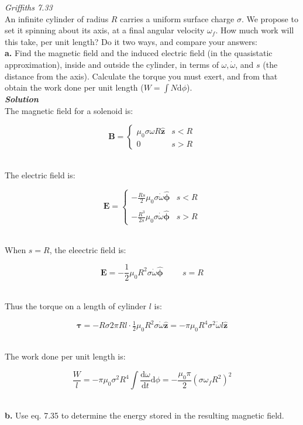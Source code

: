 \documentclass[14pt]{extarticle}
\renewcommand{\v}[1]{{\bm #1}}
\newcommand{\hv}[1]{\hat{\bm{#1}}}
\newcommand{\bfit}[1]{\textbf{\textit{#1}}}
\renewcommand{\d}{\text{d}}
\newcommand{\ddt}[1]{\frac{\d #1}{\d t}}
\newcommand{\muo}{\mu_0}
\begin{document}
{\it Griffiths 7.33} \\ 

An infinite cylinder of radius $R$ carries a uniform surface charge $\sigma$. We propose to set it spinning about its axis, at a final angular velocity $\omega_f$. How much work will this take, per unit length? Do it two ways, and compare your answers: \\ 

{\Large \bf a.} Find the magnetic field and the induced electric field (in the quasistatic  approximation), inside and outside the cylinder, in terms of $\omega,  \dot\omega$, and $s$ (the distance from the axis). Calculate the torque you must exert, and from that obtain the work  done per unit length ($W = \int N\d\phi$). \\ 

{\bfit{Solution}} \\ 

The magnetic field for a solenoid is:

$$
\v B = 
\begin{cases}
	\muo \sigma\omega R \hv z & s < R \\ 
	0 & s > R
\end{cases}
$$ \ 

The electric field is:

$$
\v E = 
\begin{cases}
	 -\frac{Rs}{2} \muo \sigma \dot\omega \hv \phi & s < R \\
	 \\ 
	 -\frac{R^3}{2s} \muo \sigma \dot\omega \hv \phi & s > R
\end{cases}
$$ \ 

When $s=R$, the eleectric field is:

$$\v E = -\frac 12 \muo R^2 \sigma \dot\omega \hv \phi \hspace{1cm} s=R$$ \ 

Thus the torque on a length of cylinder $l$ is:

$$\v \tau = -R\sigma 2\pi Rl \cdot \tfrac 12 \muo R^2 \sigma \dot\omega \hv z = -\pi \muo R^4 \sigma^2 \dot\omega l \hv z$$ \ 

The work  done per unit length is:

$$\frac Wl = -\pi \muo \sigma^2 R^4 \int \ddt\omega \d \phi = -\frac{\muo  \pi}{2} (\sigma \omega_f R^2)^2$$ \ 




\dotfill 

\hfill 

{\Large \bf b.} Use eq. 7.35 to  determine the energy stored in the resulting magnetic field. \\ 
\end{document}
